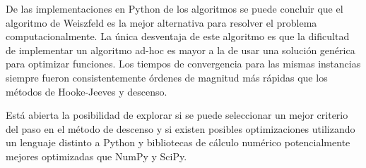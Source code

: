 \documentclass[10pt]{article}
\begin{document}
De las implementaciones en Python de los algoritmos se puede concluir que el algoritmo de Weiszfeld es la mejor alternativa para resolver el problema computacionalmente. La única desventaja de este algoritmo es que la dificultad de implementar un algoritmo ad-hoc es mayor a la de usar una solución genérica para optimizar funciones. Los tiempos de convergencia para las mismas instancias siempre fueron consistentemente órdenes de magnitud más rápidas que los métodos de Hooke-Jeeves y descenso.

Está abierta la posibilidad de explorar si se puede seleccionar un mejor criterio del paso en el método de descenso y si existen posibles optimizaciones utilizando un lenguaje distinto a Python y bibliotecas de cálculo numérico potencialmente mejores optimizadas que NumPy y SciPy.
\end{document}
